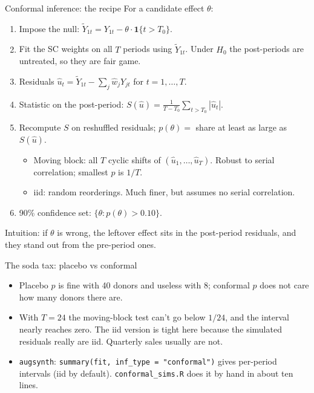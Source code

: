 \documentclass[aspectratio=169,11pt]{beamer}
\begin{document}
\begin{frame}{Conformal inference: the recipe}
For a candidate effect $\theta$:
\begin{enumerate}
\item Impose the null: $\tilde Y_{1t} = Y_{1t} - \theta \cdot \mathbf{1}\{t > T_0\}$.
\item Fit the SC weights on \alert{all} $T$ periods using $\tilde Y_{1t}$. Under $H_0$ the post-periods are untreated, so they are fair game.
\item Residuals $\hat u_t = \tilde Y_{1t} - \sum_j \hat w_j Y_{jt}$ for $t = 1, \ldots, T$.
\item Statistic on the post-period: $S(\hat u) = \frac{1}{T - T_0}\sum_{t > T_0} |\hat u_t|$.
\item Recompute $S$ on reshuffled residuals; $p(\theta) = $ share at least as large as $S(\hat u)$.
\begin{itemize}
\item \alert{Moving block}: all $T$ cyclic shifts of $(\hat u_1, \ldots, \hat u_T)$. Robust to serial correlation; smallest $p$ is $1/T$.
\item \alert{iid}: random reorderings. Much finer, but assumes no serial correlation.
\end{itemize}
\item 90\% confidence set: $\{\theta : p(\theta) > 0.10\}$.
\end{enumerate}
\small Intuition: if $\theta$ is wrong, the leftover effect sits in the post-period residuals, and they stand out from the pre-period ones.
\end{frame}

\begin{frame}{The soda tax: placebo vs conformal}
\begin{center}
\small

\end{center}
\medskip
\small
\begin{itemize}
\item Placebo $p$ is fine with 40 donors and useless with 8; conformal $p$ does not care how many donors there are.
\item With $T = 24$ the moving-block test can't go below $1/24$, and the interval nearly reaches zero. The iid version is tight here because the simulated residuals really are iid. Quarterly sales usually are not.
\item \texttt{augsynth}: \texttt{summary(fit, inf\_type = "conformal")} gives per-period intervals (iid by default). \texttt{conformal\_sims.R} does it by hand in about ten lines.
\end{itemize}
\end{frame}
\end{document}
